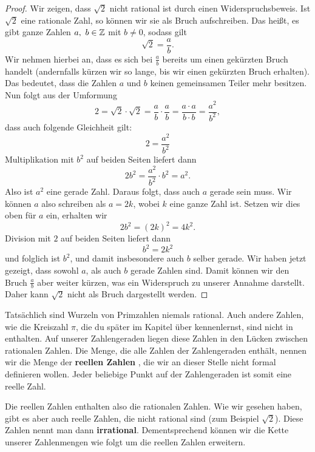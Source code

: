 \documentclass[../../main.tex]{subfiles}
\begin{document}
	\begin{proof}
		Wir zeigen, dass $\sqrt{2}$ nicht rational ist durch einen Widerspruchsbeweis. Ist $\sqrt{2}$ eine rationale Zahl, so können wir sie als Bruch aufschreiben. Das heißt, es gibt ganze Zahlen $a, \ b\in\Integer$ mit $b \neq 0$, sodass gilt
		$$\sqrt{2} = \frac{a}{b}.$$
		Wir nehmen hierbei an, dass es sich bei $\frac{a}{b}$ bereits um einen gekürzten Bruch handelt (andernfalls kürzen wir so lange, bis wir einen gekürzten Bruch erhalten). Das bedeutet, dass die Zahlen $a$ und $b$ keinen gemeinsamen Teiler mehr besitzen. Nun folgt aus der Umformung
		$$2 = \sqrt{2}\cdot\sqrt{2} = \frac{a}{b}\cdot\frac{a}{b} =\frac{a\cdot a}{b\cdot b}= \frac{a^2}{b^2},$$
		dass auch folgende Gleichheit gilt:
		$$2 = \frac{a^2}{b^2}$$
		Multiplikation mit $b^2$ auf beiden Seiten liefert dann
		$$2b^2 = \frac{a^2}{b^2}\cdot b^2 = a^2.$$ 
		Also ist $a^2$ eine gerade Zahl. Daraus folgt, dass auch $a$ gerade sein muss. Wir können $a$ also schreiben als 
		$a = 2k$, wobei $k$ eine ganze Zahl ist. Setzen wir dies oben für $a$ ein, erhalten wir
		$$2b^2 = \left(2k\right)^2 = 4k^2.$$
		Division mit $2$ auf beiden Seiten liefert dann
		$$b^2 = 2k^2$$
		und folglich ist $b^2$, und damit insbesondere auch $b$ selber gerade. Wir haben jetzt gezeigt, dass sowohl $a$, als auch $b$ gerade Zahlen sind. Damit können wir den Bruch $\frac{a}{b}$ aber weiter kürzen, was ein Widerspruch zu unserer Annahme darstellt. Daher kann $\sqrt{2}$ nicht als Bruch dargestellt werden.
	\end{proof}

	Tatsächlich sind Wurzeln von Primzahlen niemals rational. Auch andere Zahlen, wie die Kreiszahl $\pi$, die du später im Kapitel über  kennenlernst, sind nicht in \Rational enthalten. Auf unserer Zahlengeraden liegen diese Zahlen in den Lücken zwischen rationalen Zahlen. Die Menge, die alle Zahlen der Zahlengeraden enthält, nennen wir die Menge der \textbf{reellen Zahlen} \Real, die wir an dieser Stelle nicht formal definieren wollen. Jeder beliebige Punkt auf der Zahlengeraden ist somit eine reelle Zahl.
	
	Die reellen Zahlen enthalten also die rationalen Zahlen. Wie wir gesehen haben, gibt es aber auch reelle Zahlen, die nicht rational sind (zum Beispiel $\sqrt{2}$). Diese Zahlen nennt man dann \textbf{irrational}. Dementsprechend können wir die Kette unserer Zahlenmengen wie folgt um die reellen Zahlen erweitern. 
	
\end{document}
